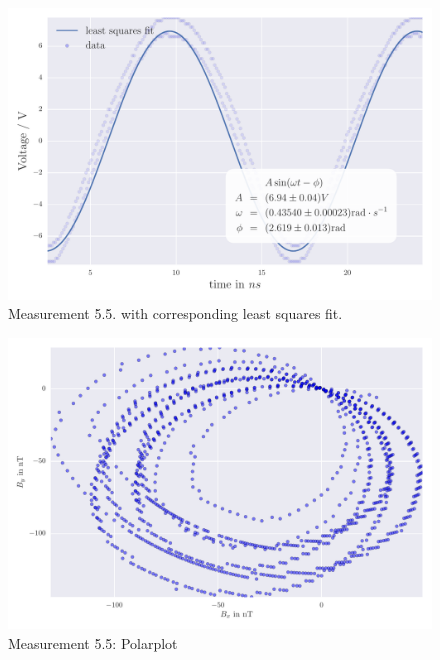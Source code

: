 \begin{figure}[H]
    \centering
    \includegraphics[width=0.7\linewidth]{analysis/figures/fit5_5}
    \caption{Measurement 5.5. with corresponding least squares fit.}
    \label{fig:5_5_plot}
\end{figure}
\begin{figure}[H]
    \centering
    \includegraphics[width=0.7\linewidth]{analysis/figures/polar5_5}
    \caption{Measurement 5.5: Polarplot}
    \label{fig:5_5_polar}
\end{figure}

